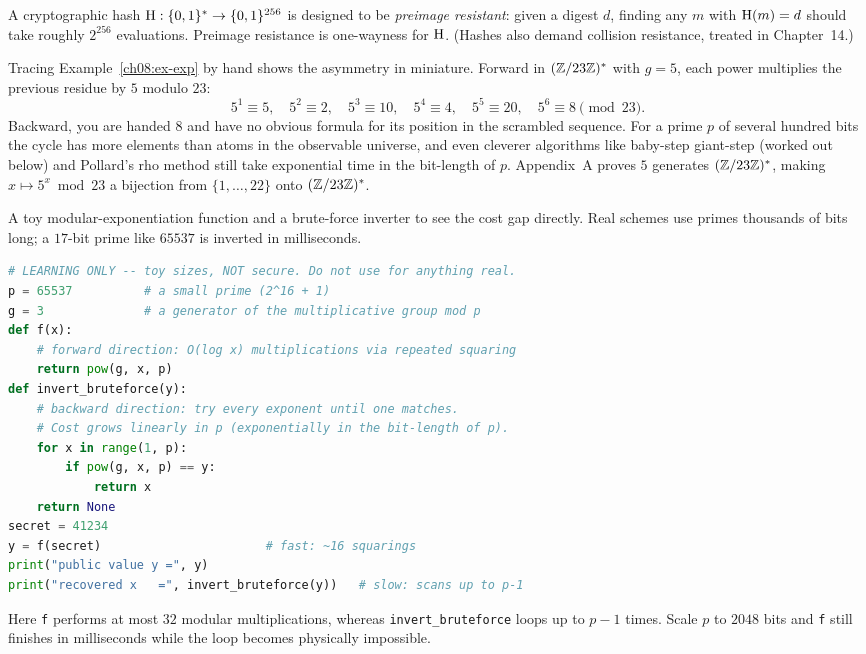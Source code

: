 \begin{example}
\label{ch08:ex-hash}
A cryptographic hash $\operatorname{H}:\{0,1\}^{*}\to\{0,1\}^{256}$ is designed to be \emph{preimage resistant}: given a digest $d$, finding any $m$ with $\operatorname{H}(m)=d$ should take roughly $2^{256}$ evaluations. Preimage resistance is one-wayness for $\operatorname{H}$. (Hashes also demand collision resistance, treated in Chapter~14.)
\end{example}

\begin{connectionbox}
Tracing Example~\ref{ch08:ex-exp} by hand shows the asymmetry in miniature. Forward in $(\mathbb{Z}/23\mathbb{Z})^{*}$ with $g=5$, each power multiplies the previous residue by $5$ modulo $23$:
\[
5^1 \equiv 5,\quad 5^2 \equiv 2,\quad 5^3 \equiv 10,\quad 5^4 \equiv 4,\quad 5^5 \equiv 20,\quad 5^6 \equiv 8 \pmod{23}.
\]
Backward, you are handed $8$ and have no obvious formula for its position in the scrambled sequence. For a prime $p$ of several hundred bits the cycle has more elements than atoms in the observable universe, and even cleverer algorithms like baby-step giant-step (worked out below) and Pollard's rho method still take exponential time in the bit-length of $p$. Appendix~A proves $5$ generates $(\mathbb{Z}/23\mathbb{Z})^{*}$, making $x \mapsto 5^x \bmod 23$ a bijection from $\{1,\dots,22\}$ onto $(\mathbb{Z}/23\mathbb{Z})^{*}$.
\end{connectionbox}

\begin{implementbox}
A toy modular-exponentiation function and a brute-force inverter to see the cost gap directly. Real schemes use primes thousands of bits long; a $17$-bit prime like $65537$ is inverted in milliseconds.
\begin{lstlisting}[language=Python]
# LEARNING ONLY -- toy sizes, NOT secure. Do not use for anything real.
p = 65537          # a small prime (2^16 + 1)
g = 3              # a generator of the multiplicative group mod p
def f(x):
    # forward direction: O(log x) multiplications via repeated squaring
    return pow(g, x, p)
def invert_bruteforce(y):
    # backward direction: try every exponent until one matches.
    # Cost grows linearly in p (exponentially in the bit-length of p).
    for x in range(1, p):
        if pow(g, x, p) == y:
            return x
    return None
secret = 41234
y = f(secret)                       # fast: ~16 squarings
print("public value y =", y)
print("recovered x   =", invert_bruteforce(y))   # slow: scans up to p-1
\end{lstlisting}
Here \texttt{f} performs at most $32$ modular multiplications, whereas \texttt{invert\_bruteforce} loops up to $p - 1$ times. Scale $p$ to $2048$ bits and \texttt{f} still finishes in milliseconds while the loop becomes physically impossible.
\end{implementbox}

